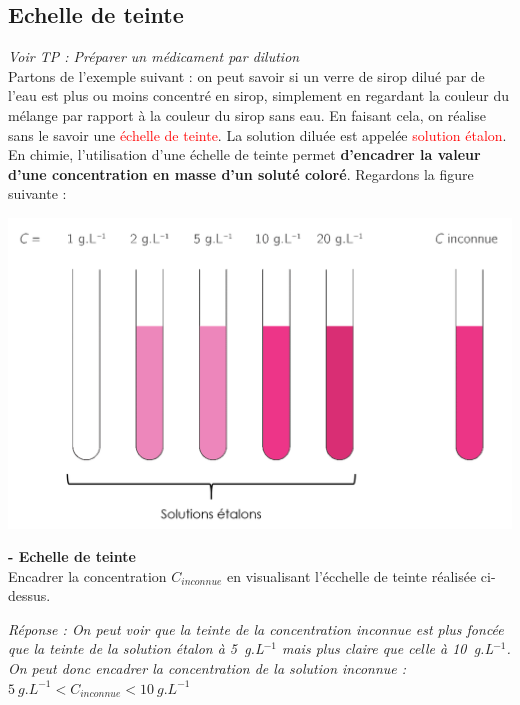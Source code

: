 \subsection{Echelle de teinte}
\begin{Large}
\end{Large}\textit{Voir TP : Préparer un médicament par dilution}\\
Partons de l'exemple suivant : on peut savoir si un verre de sirop dilué par de l'eau est plus ou moins concentré en sirop, simplement en regardant la couleur du mélange par rapport à la couleur du sirop sans eau. En faisant cela, on réalise sans le savoir une \textcolor{red}{échelle de teinte}. La solution diluée est appelée \textcolor{red}{solution étalon}.\\
En chimie, l'utilisation d'une échelle de teinte permet \textbf{d'encadrer la valeur d'une concentration en masse d'un soluté coloré}. Regardons la figure suivante :

\begin{center}
    \includegraphics[scale=0.45]{Images/Echelle_teinte.png}
\end{center}

\begin{mdframed}[style=autreexo]
\textbf{ - Echelle de teinte}\\
Encadrer la concentration $C_{inconnue}$ en visualisant l'écchelle de teinte réalisée ci-dessus.
\end{mdframed}
\textit{Réponse : On peut voir que la teinte de la concentration inconnue est plus foncée que la teinte de la solution étalon à 5~g.L$^{-1}$ mais plus claire que celle à 10~g.L$^{-1}$. On peut donc encadrer la concentration de la solution inconnue : $5~g.L^{-1}<C_{inconnue}<10~g.L^{-1}$} 


